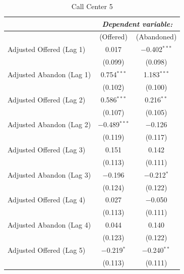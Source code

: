 \documentclass[manuscript,screen,authorversion]{acmart}
\begin{document}
\begin{table}[!htbp]
\centering
\caption{Call Center 5}
\label{tbl-call-center-5}
\small
\renewcommand{\arraystretch}{0.88}
\setlength{\tabcolsep}{3.5pt}

\begin{tabularx}{0.92\linewidth}{@{\extracolsep{\fill}}>{\raggedright\arraybackslash}Xcc}
\hline\hline
 & \multicolumn{2}{c}{\textit{Dependent variable:}} \\
\cline{2-3}
 & (Offered) & (Abandoned) \\
\hline

Adjusted Offered (Lag 1)  & 0.017 & $-$0.402$^{***}$ \\
 & {\scriptsize (0.099)} & {\scriptsize (0.098)} \\

Adjusted Abandon (Lag 1)  & 0.754$^{***}$ & 1.183$^{***}$ \\
 & {\scriptsize (0.102)} & {\scriptsize (0.100)} \\

Adjusted Offered (Lag 2)  & 0.586$^{***}$ & 0.216$^{**}$ \\
 & {\scriptsize (0.107)} & {\scriptsize (0.105)} \\

Adjusted Abandon (Lag 2)  & $-$0.489$^{***}$ & $-$0.126 \\
 & {\scriptsize (0.119)} & {\scriptsize (0.117)} \\

Adjusted Offered (Lag 3)  & 0.151 & 0.142 \\
 & {\scriptsize (0.113)} & {\scriptsize (0.111)} \\

Adjusted Abandon (Lag 3)  & $-$0.196 & $-$0.212$^{*}$ \\
 & {\scriptsize (0.124)} & {\scriptsize (0.122)} \\

Adjusted Offered (Lag 4)  & 0.027 & $-$0.050 \\
 & {\scriptsize (0.113)} & {\scriptsize (0.111)} \\

Adjusted Abandon (Lag 4)  & 0.044 & 0.140 \\
 & {\scriptsize (0.123)} & {\scriptsize (0.122)} \\

Adjusted Offered (Lag 5)  & $-$0.219$^{*}$ & $-$0.240$^{**}$ \\
 & {\scriptsize (0.113)} & {\scriptsize (0.111)} \\


\end{tabularx}
\end{table}
\end{document}
